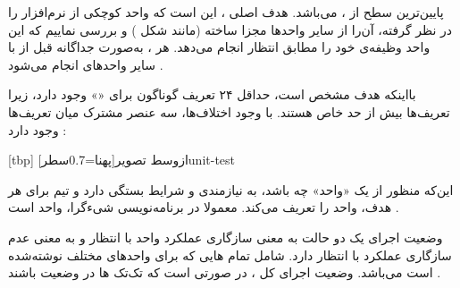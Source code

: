 
پایین‌ترین سطح از ،  می‌باشد. هدف اصلی
، این است که واحد کوچکی از نرم‌افزار را در نظر گرفته،
آن‌را از سایر واحد‌ها مجزا ساخته (مانند شکل ) و
بررسی نماییم که این واحد وظیفه‌ی خود را مطابق انتظار انجام می‌دهد. هر
، به‌صورت جداگانه قبل از  با سایر
واحدهای  انجام می‌شود .

بااینکه هدف  مشخص است، حداقل ۲۴ تعریف گوناگون برای
«» وجود دارد، زیرا تعریف‌ها بیش از حد خاص هستند. با
وجود اختلاف‌ها، سه عنصر مشترک میان تعریف‌ها وجود دارد
:






[tbp]
‌ازوسط
‌تصویر[پهنا=0.7‌سطر]{unit-test}

این‌که منظور از یک «واحد» چه باشد، به نیازمندی و شرایط بستگی دارد و تیم
برای هر هدف، واحد را تعریف می‌کند. معمولا در برنامه‌نویسی شیء‌گرا، واحد
 است .

وضعیت اجرای یک  دو حالت  به معنی سازگاری
عملکرد واحد با انتظار و  به معنی عدم سازگاری عملکرد با
انتظار دارد.  شامل تمام ‌هایی که برای واحدهای
مختلف نوشته‌شده است می‌باشد. وضعیت اجرای کل ، در صورتی
 است که تک‌تک ‌ها در وضعیت  باشند
.

